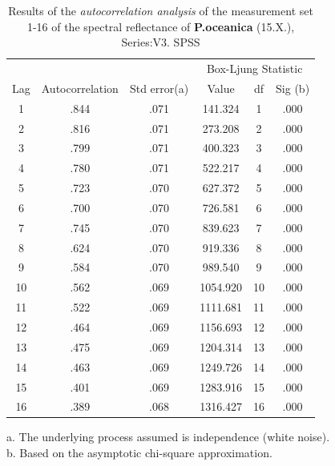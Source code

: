 \documentclass[10pt, a4paper]{article}
\begin{document}
\begin{appendices}
\begin{table}[htbp]
\caption{Results of the \textit{autocorrelation analysis} of the measurement set 1-16 of the spectral reflectance of \textbf{P.oceanica} (15.X.), Series:V3. SPSS}
\label{tab:11}
\begin{center}
\begin{tabular}{|c|c|c|c|c|c|}
\hline\hline
& & & \multicolumn{3}{c|}{Box-Ljung Statistic}\\
\cline{4-6}
Lag & Autocorrelation & Std error(a) & Value & df & Sig (b)\\ \hline\hline
1 & .844 & .071 & 141.324 & 1 & .000 \\ \hline
2 & .816 & .071 & 273.208 & 2 & .000 \\ \hline
3 & .799 & .071 & 400.323 & 3 & .000 \\ \hline
4 & .780 & .071 & 522.217 & 4 & .000 \\ \hline
5 & .723 & .070 & 627.372 & 5 & .000 \\ \hline
6 & .700 & .070 & 726.581 & 6 & .000 \\ \hline
7 & .745 & .070 & 839.623 & 7 & .000 \\ \hline
8 & .624 & .070 & 919.336 & 8 & .000 \\ \hline
9 & .584 & .070 & 989.540 & 9 & .000 \\ \hline
10 & .562 & .069 & 1054.920 & 10 & .000 \\ \hline
11 & .522 & .069 & 1111.681 & 11 & .000 \\ \hline
12& .464 & .069 & 1156.693 & 12 & .000 \\ \hline
13 & .475 & .069 & 1204.314 & 13 & .000 \\ \hline
14 & .463 & .069 & 1249.726 & 14 & .000 \\ \hline
15 & .401 & .069 & 1283.916 & 15 & .000 \\ \hline
16 & .389 & .068 & 1316.427 & 16 & .000 \\ \hline
\end{tabular}
\end{center}
a. The underlying process assumed is independence (white noise).\\
b. Based on the asymptotic chi-square approximation.
\label{fig:5}
\end{table}


\end{appendices}
\end{document}
